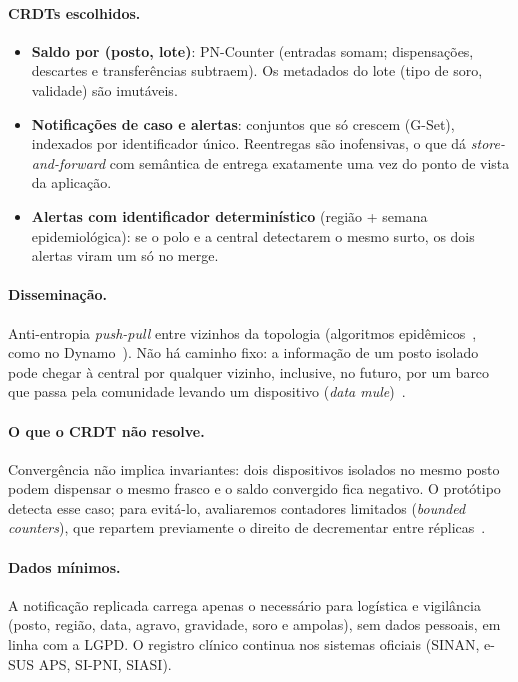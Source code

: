 \documentclass[a4paper,12pt]{article}
\begin{document}
\paragraph{CRDTs escolhidos.}
\begin{itemize}
  \item \textbf{Saldo por (posto, lote)}: PN-Counter (entradas somam; dispensações,
        descartes e transferências subtraem). Os metadados do lote (tipo de
        soro, validade) são imutáveis.
  \item \textbf{Notificações de caso e alertas}: conjuntos que só crescem
        (G-Set), indexados por identificador único. Reentregas são inofensivas,
        o que dá \emph{store-and-forward} com semântica de entrega exatamente uma vez
        do ponto de vista da aplicação.
  \item \textbf{Alertas com identificador determinístico} (região + semana
        epidemiológica): se o polo e a central detectarem o mesmo surto, os dois
        alertas viram um só no merge.
\end{itemize}

\paragraph{Disseminação.} Anti-entropia \emph{push-pull} entre vizinhos da
topologia (algoritmos epidêmicos~\cite{demers1987}, como no
Dynamo~\cite{decandia2007}). Não há caminho fixo: a informação de um posto
isolado pode chegar à central por qualquer vizinho, inclusive, no futuro, por
um barco que passa pela comunidade levando um dispositivo (\emph{data
mule})~\cite{pentland2004,fall2003}.

\paragraph{O que o CRDT não resolve.} Convergência não implica invariantes:
dois dispositivos isolados no mesmo posto podem dispensar o mesmo frasco e o
saldo convergido fica negativo. O protótipo detecta esse caso; para
evitá-lo, avaliaremos contadores limitados (\emph{bounded counters}), que
repartem previamente o direito de decrementar entre réplicas~\cite{balegas2015}.

\paragraph{Dados mínimos.} A notificação replicada carrega apenas o necessário
para logística e vigilância (posto, região, data, agravo, gravidade, soro e
ampolas), sem dados pessoais, em linha com a LGPD. O registro clínico
continua nos sistemas oficiais (SINAN, e-SUS APS, SI-PNI, SIASI).
\end{document}
